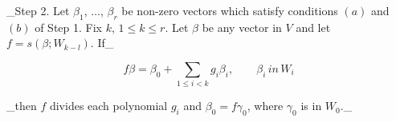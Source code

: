 _Step 2. Let \(\beta_{1}\), \(\ldots\), \(\beta_{r}\) be non-zero vectors which satisfy conditions \((a)\) and \((b)\) of Step 1. Fix \(k\), \(1\leq k\leq r\). Let \(\beta\) be any vector in \(V\) and let \(f=s(\beta;W_{k-l})\). If_

\[f\beta=\beta_{0}+\sum_{1\leq i<k}g_{i}\beta_{i},\qquad\beta_{i}\,in\,W_{i}\]

_then \(f\) divides each polynomial \(g_{i}\) and \(\beta_{0}=f\gamma_{0}\), where \(\gamma_{0}\) is in \(W_{0}\)._ 